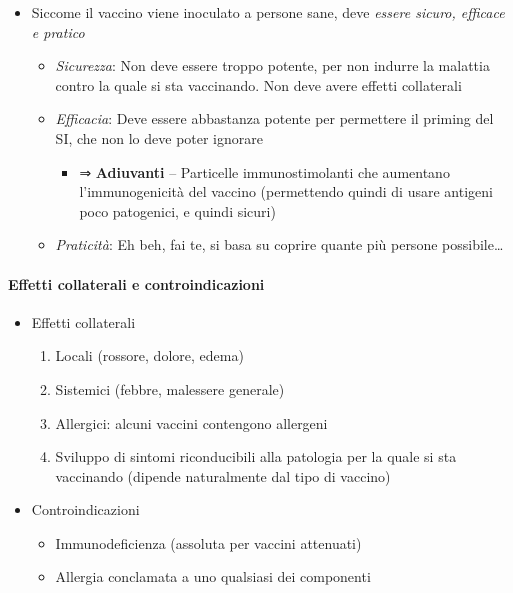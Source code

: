 \documentclass[italian,]{article}
\providecommand{\tightlist}{%
  \setlength{\itemsep}{0pt}\setlength{\parskip}{0pt}}
\begin{document}
\begin{itemize}
\tightlist
\item
  Siccome il vaccino viene inoculato a persone sane, deve \emph{essere
  sicuro, efficace e pratico}

  \begin{itemize}
  \tightlist
  \item
    \emph{Sicurezza}: Non deve essere troppo potente, per non indurre la
    malattia contro la quale si sta vaccinando. Non deve avere effetti
    collaterali
  \item
    \emph{Efficacia}: Deve essere abbastanza potente per permettere il
    priming del SI, che non lo deve poter ignorare

    \begin{itemize}
    \tightlist
    \item
      ⇒ \textbf{Adiuvanti} -- Particelle immunostimolanti che aumentano
      l'immunogenicità del vaccino (permettendo quindi di usare antigeni
      poco patogenici, e quindi sicuri)
    \end{itemize}
  \item
    \emph{Praticità}: Eh beh, fai te, si basa su coprire quante più
    persone possibile\ldots{}
  \end{itemize}
\end{itemize}

\hypertarget{effetti-collaterali-e-controindicazioni}{%
\paragraph{Effetti collaterali e
controindicazioni}\label{effetti-collaterali-e-controindicazioni}}

\begin{itemize}
\tightlist
\item
  Effetti collaterali

  \begin{enumerate}
  \def\labelenumi{\arabic{enumi}.}
  \tightlist
  \item
    Locali (rossore, dolore, edema)
  \item
    Sistemici (febbre, malessere generale)
  \item
    Allergici: alcuni vaccini contengono allergeni
  \item
    Sviluppo di sintomi riconducibili alla patologia per la quale si sta
    vaccinando (dipende naturalmente dal tipo di vaccino)
  \end{enumerate}
\item
  Controindicazioni

  \begin{itemize}
  \tightlist
  \item
    Immunodeficienza (assoluta per vaccini attenuati)
  \item
    Allergia conclamata a uno qualsiasi dei componenti
  \end{itemize}
\end{itemize}
\end{document}
